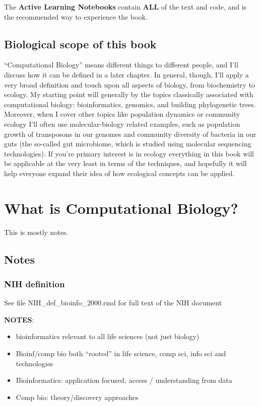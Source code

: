 \documentclass[
]{book}
\providecommand{\tightlist}{%
  \setlength{\itemsep}{0pt}\setlength{\parskip}{0pt}}
\begin{document}
The \textbf{Active Learning Notebooks} contain \textbf{ALL} of the text and code, and is the recommended way to experience the book.

\hypertarget{biological-scope-of-this-book}{%
\section{Biological scope of this book}\label{biological-scope-of-this-book}}

``Computational Biology'' means different things to different people, and I'll discuss how it can be defined in a later chapter. In general, though, I'll apply a very broad definition and touch upon all aspects of biology, from biochemistry to ecology. My starting point will generally by the topics classically associated with computational biology: bioinformatics, genomics, and building phylogenetic trees. Moreover, when I cover other topics like population dynamics or community ecology I'll often use molecular-biology related examples, such as population growth of transposons in our genomes and community diversity of bacteria in our guts (the so-called gut microbiome, which is studied using molecular sequencing technologies). If you're primary interest is in ecology everything in this book will be applicable at the very least in terms of the techniques, and hopefully it will help everyone expand their idea of how ecological concepts can be applied.

\hypertarget{what-is-computational-biology}{%
\chapter{What is Computational Biology?}\label{what-is-computational-biology}}

This is mostly notes.

\hypertarget{notes}{%
\section{Notes}\label{notes}}

\hypertarget{nih-definition}{%
\subsection{NIH definition}\label{nih-definition}}

See file NIH\_def\_bioinfo\_2000.rmd for full text of the NIH document

\textbf{NOTES}:

\begin{itemize}
\tightlist
\item
  bioinformatics relevant to all life sciences (not just biology)
\item
  Bioinf/comp bio both ``rooted'' in life science, comp sci, info sci and technologies
\item
  Bioinformatics: application focused, access / understanding from data
\item
  Comp bio: theory/discovery approaches
\end{itemize}
\end{document}
